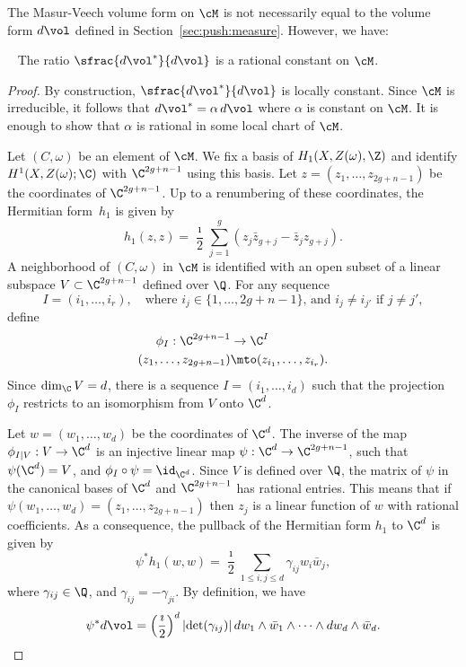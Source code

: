 The Masur-Veech volume form on $\cM$ is not necessarily equal to the volume form $d\vol$ defined in Section~\ref{sec:push:measure}. However, we have:

\begin{Proposition}~\label{prop:compare:meas:arith}
The ratio $\sfrac{d\vol^*}{d\vol}$ is a rational constant on $\cM$.
\end{Proposition}

\begin{proof}
By construction, $\sfrac{d\vol^*}{d\vol}$ is locally constant. Since $\cM$ is irreducible, it follows that $d\vol^*=\alpha\, d\vol$ where $\alpha$ is constant on $\cM$. It is enough to show that $\alpha$ is rational in some local chart of $\cM$.

Let $(C,\omega)$ be an element of $\cM$. We fix a basis of $H_1(X,Z(\omega),\Z)$ and identify $H^1(X,Z(\omega);\C)$ with $\C^{2g+n-1}$ using this basis.
Let $z=(z_1,\dots, z_{2g+n-1})$ be the coordinates of $\C^{2g+n-1}$.
Up to a renumbering of these coordinates, the Hermitian form~$h_1$ is given by
\[
h_1(z,z)=\frac{\imath}{2}\sum_{j=1}^g(z_j\bar{z}_{g+j}-\bar{z}_jz_{g+j}).
\]
A neighborhood of $(C,\omega)$ in $\cM$ is identified with an open subset of a linear subspace $V\subset \C^{2g+n-1}$ defined over $\Q$.
For any sequence
\[
I=(i_1,\dots,i_r),\quad\text{where $i_j\in \{1,\dots,2g+n-1\}$, and $i_j\neq i_{j'}$ if $j\neq j'$},
\]
define
\begin{align*}
\phi_I: \C^{2g+n-1} & \to \C^{I}\\
(z_1,\dots,z_{2g+n-1}) & \mto (z_{i_1},\dots,z_{i_r}).
\end{align*}
Since $\dim_\C V=d$, there is a sequence $I=(i_1,\dots,i_d)$ such that the projection $\phi_I$ restricts to an isomorphism from $V$ onto $\C^{d}$.

Let $w=(w_1,\dots,w_d)$ be the coordinates of $\C^d$. The inverse of the map \hbox{$\phi_{I|V}: V \to \C^d$} is an injective linear map $\psi: \C^d \to \C^{2g+n-1}$, such that $\psi(\C^d)=V$, and $\phi_I\circ\psi =\id_{\C^d}$. Since $V$ is defined over $\Q$, the matrix of $\psi$ in the canonical bases of $\C^d$ and $\C^{2g+n-1}$ has rational entries. This means that if $\psi(w_1,\dots,w_d)=(z_1,\dots,z_{2g+n-1})$ then $z_j$ is a linear function of $w$ with rational coefficients.
As a consequence, the pullback of the Hermitian form $h_1$ to $\C^{d}$ is given by
\[
\psi^*h_1(w,w)=\frac{\imath}{2}\sum_{1\leq i,j\leq d}\gamma_{ij}w_i\bar{w}_j,
\]
where $\gamma_{ij}\in \Q$, and $\gamma_{ij}=-\gamma_{ji}$.
By definition, we have
\[
\psi^*d\vol=\left(\frac{\imath}{2}\right)^d\left|{\det}(\gamma_{ij})\right|dw_1\wedge\bar{w}_1\wedge\dots\wedge dw_d\wedge\bar{w}_d.
\]


\end{proof}
